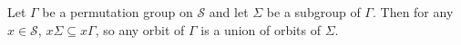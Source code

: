 Let $\Gamma$ be a permutation group on $\mathcal{S}$ and let $\Sigma$ be a subgroup of $\Gamma$. Then for any $x \in \mathcal{S}$, $x\Sigma \subseteq x\Gamma$, so any orbit of $\Gamma$ is a union of orbits of $\Sigma$.
